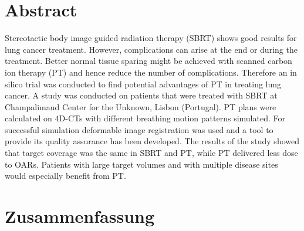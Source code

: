 \section*{Abstract}


Stereotactic body image guided radiation therapy (SBRT) shows good results for lung cancer treatment. However, complications can arise at the end or during the treatment. 
Better normal tissue sparing might be achieved with scanned carbon ion therapy (PT) and hence reduce the number of complications. 
Therefore an in silico trial was conducted to find potential advantages of PT in treating lung cancer. 
A study was conducted on patients that were treated with SBRT at Champalimaud Center for the Unknown, Lisbon (Portugal). 
PT plans were calculated on 4D-CTs with different breathing motion patterns simulated. For successful simulation
deformable image registration was used and a tool to provide its quality assurance has been developed. 
The results of the study showed that target coverage was the same in SBRT and PT, while PT delivered less dose to OARs. 
Patients with large target volumes and with multiple disease sites would especially benefit from PT.



\section*{Zusammenfassung}

